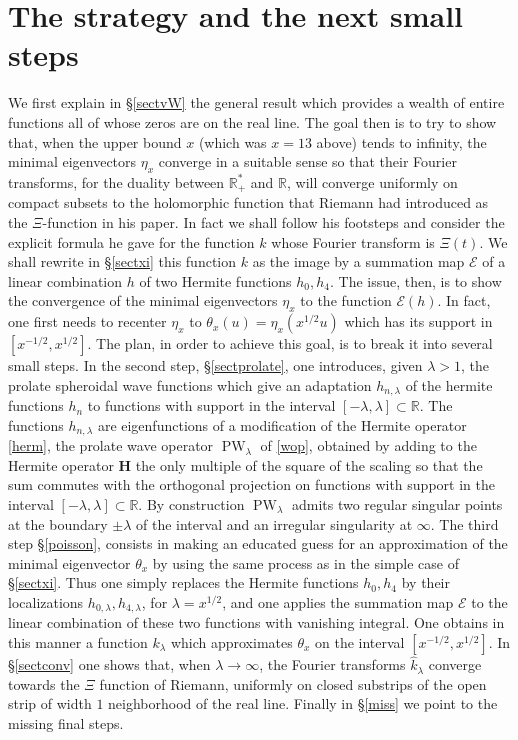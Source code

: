 \documentclass{article}
\def\pw{\operatorname{PW}}
\def\R{{\mathbb R}}
\def\cE{{\mathcal E}}
\begin{document}
\section{The strategy and the  next small steps}
We first explain in \S \ref{sectvW} the general result which provides a wealth of entire functions all of whose zeros are on the real line.
The goal then is to try to show that, when the upper bound $x$ (which was $x=13$ above) tends to infinity, the minimal eigenvectors $\eta_x$ converge in a suitable sense so that their Fourier transforms, for the duality between $\R^*_+$ and $\R$, will converge uniformly on compact subsets to the holomorphic function that Riemann had introduced as the $\Xi$-function in his paper. In fact we shall follow  his footsteps and consider the explicit formula he gave for the function $k$ whose Fourier  transform is  $\Xi(t)$. We shall  rewrite in \S \ref{sectxi} this function $k$ as the image by a summation map $\cE$ of a linear combination $h$ of two Hermite functions $h_0,h_4$. The issue, then, is to show the convergence of the minimal eigenvectors $\eta_x$ to the function $\cE(h)$. In fact, one first needs to recenter $\eta_x$ to $\theta_x(u)=\eta_x(x^{1/2}u)$ which has its support  in $[x^{-1/2},x^{1/2}]$. The plan, in order to achieve this goal, is to break it into several small steps. In the second step, \S \ref{sectprolate}, one introduces, given $\lambda>1$, the prolate spheroidal wave functions which give an adaptation $h_{n,\lambda}$ of the hermite functions $h_n$ to functions with support in the interval $[-\lambda,\lambda]\subset \R$.  The functions $h_{n,\lambda}$ are eigenfunctions of a modification of the Hermite operator \eqref{herm}, the prolate wave operator $\pw_\lambda$ of \eqref{wop}, obtained by adding to the Hermite operator $\mathbf{H}$ the only multiple of the  square of the scaling so that the sum commutes with the orthogonal projection on functions with support in the interval $[-\lambda,\lambda]\subset \R$. By construction $\pw_\lambda$ admits two regular singular points at the boundary $\pm \lambda$ of the interval and an irregular singularity at $\infty$. The third step \S \ref{poisson}, consists in making an educated guess for an approximation  of the minimal eigenvector $\theta_x$ by using the same process as in the simple case of \S \ref{sectxi}. Thus one simply replaces the Hermite functions $h_0,h_4$ by their localizations $h_{0,\lambda},h_{4,\lambda}$, for $\lambda=x^{1/2}$,
and one applies the summation map $\cE$ to the  linear combination of these two functions with vanishing integral. One obtains in this manner a function $k_\lambda$ which approximates $\theta_x$ on the interval $[x^{-1/2},x^{1/2}]$. In \S \ref{sectconv} one shows that, when $\lambda\to \infty$, the Fourier transforms $\widehat k_\lambda$ converge towards the $\Xi$ function of Riemann, uniformly on closed substrips of the open  strip of width $1$ neighborhood of the real line. Finally in \S \ref{miss} we point to the missing final steps.
\end{document}
